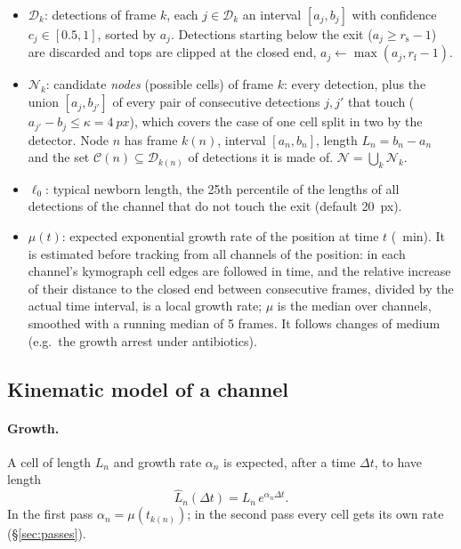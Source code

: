\documentclass[11pt,a4paper]{article}
\newcommand{\rf}{r_{\mathrm{f}}}     %
\newcommand{\rs}{r_{\mathrm{s}}}     %
\begin{document}
\begin{itemize}
\item $\mathcal D_k$: detections of frame $k$, each $j\in\mathcal D_k$ an interval $[a_j,b_j]$ with confidence $c_j\in[0.5,1]$, sorted by $a_j$. Detections starting below the exit ($a_j\ge\rs-1$) are discarded and tops are clipped at the closed end, $a_j\leftarrow\max(a_j,\rf-1)$.
\item $\mathcal N_k$: candidate \emph{nodes} (possible cells) of frame $k$: every detection, plus the union $[a_j,b_{j'}]$ of every pair of consecutive detections $j,j'$ that touch ($a_{j'}-b_j\le\kappa=\SI{4}{px}$), which covers the case of one cell split in two by the detector. Node $n$ has frame $k(n)$, interval $[a_n,b_n]$, length $L_n=b_n-a_n$ and the set $\mathcal C(n)\subseteq\mathcal D_{k(n)}$ of detections it is made of. $\mathcal N=\bigcup_k\mathcal N_k$.
\item $\ell_0$: typical newborn length, the 25th percentile of the lengths of all detections of the channel that do not touch the exit (default \SI{20}{px}).
\item $\mu(t)$: expected exponential growth rate of the position at time $t$ (\si{\per\minute}). It is estimated before tracking from all channels of the position: in each channel's kymograph cell edges are followed in time, and the relative increase of their distance to the closed end between consecutive frames, divided by the actual time interval, is a local growth rate; $\mu$ is the median over channels, smoothed with a running median of 5 frames. It follows changes of medium (e.g.\ the growth arrest under antibiotics).
\end{itemize}

\subsection{Kinematic model of a channel}
\paragraph{Growth.} A cell of length $L_n$ and growth rate $\alpha_n$ is expected, after a time $\Delta t$, to have length
\begin{equation}
\hat L_n(\Delta t)=L_n\,e^{\alpha_n\Delta t}.
\end{equation}
In the first pass $\alpha_n=\mu(t_{k(n)})$; in the second pass every cell gets its own rate (\S\ref{sec:passes}).
\end{document}
